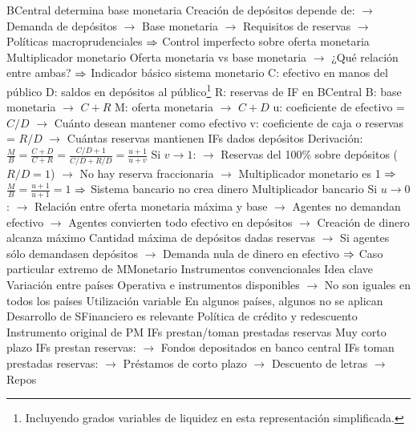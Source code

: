 \documentclass{nuevotema}
\begin{document}
\begin{esquemal}
				\4[] BCentral determina base monetaria
				\4[] Creación de depósitos depende de:
				\4[] $\to$ Demanda de depósitos
				\4[] $\to$ Base monetaria
				\4[] $\to$ Requisitos de reservas
				\4[] $\to$ Políticas macroprudenciales
				\4[] $\Rightarrow$ Control imperfecto sobre oferta monetaria
				\4 Multiplicador monetario
				\4[] Oferta monetaria vs base monetaria
				\4[] $\to$ ¿Qué relación entre ambas?
				\4[] $\Rightarrow$ Indicador básico sistema monetario
				\4[] 
				\4[] C: efectivo en manos del público
				\4[] D: saldos en depósitos al público\footnote{Incluyendo grados variables de liquidez en esta representación simplificada.}
				\4[] R: reservas de IF en BCentral
				\4[] B: base monetaria $\to$ $C+R$
				\4[] M: oferta monetaria $\to$ $C+D$
				\4[] u: coeficiente de efectivo = $C/D$
				\4[] $\to$ Cuánto desean mantener como efectivo
				\4[] v: coeficiente de caja o reservas = $R/D$
				\4[] $\to$ Cuántas reservas mantienen IFs dados depósitos
				\4[] Derivación:
				\4[] $\frac{M}{B} = \frac{C+D}{C+R} = \frac{C/D + 1}{C/D + R/D} = \frac{u+1}{u+v}$
				\4[] Si $v \to 1$:
				\4[] $\to$ Reservas del 100\% sobre depósitos ($R/D=1$)
				\4[] $\to$ No  hay reserva fraccionaria
				\4[] $\to$ Multiplicador monetario es 1
				\4[] $\Rightarrow$ $\frac{M}{B} = \frac{u+1}{u+1}=1$
				\4[] $\Rightarrow$ Sistema bancario no crea dinero
				\4 Multiplicador bancario
				\4[] Si $u \to 0$:
				\4[] $\to$ Relación entre oferta monetaria máxima y base
				\4[] 
				\4[] $\to$ Agentes no demandan efectivo
				\4[] $\to$ Agentes convierten todo efectivo en depósitos
				\4[] $\to$ Creación de dinero alcanza máximo
				\4[] Cantidad máxima de depósitos dadas reservas
				\4[] $\to$ Si agentes sólo demandasen depósitos
				\4[] $\to$ Demanda nula de dinero en efectivo
				\4[] $\Rightarrow$ Caso particular extremo de MMonetario
		\2 Instrumentos convencionales
			\3 Idea clave
				\4 Variación entre países
				\4[] Operativa e instrumentos disponibles
				\4[] $\to$ No son iguales en todos los países
				\4 Utilización variable
				\4[] En algunos países, algunos no se aplican
				\4[] Desarrollo de SFinanciero es relevante
			\3 Política de crédito y redescuento
				\4 Instrumento original de PM
				\4 IFs prestan/toman prestadas reservas
				\4[] Muy corto plazo
				\4[] IFs prestan reservas:
				\4[] $\to$ Fondos depositados en banco central
				\4[] IFs toman prestadas reservas:
				\4[] $\to$ Préstamos de corto plazo
				\4[] $\to$ Descuento de letras
				\4[] $\to$ Repos

\end{esquemal}
\end{document}
